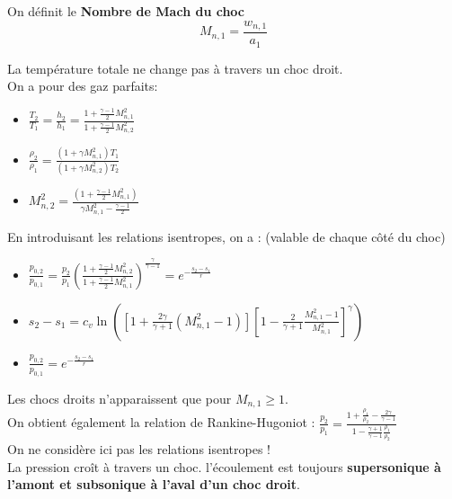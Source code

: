 \documentclass[../main.tex]{subfiles}
\begin{document}
On définit le \textbf{Nombre de Mach du choc} \begin{equation}
    M_{n,1} = \frac{w_{n,1}}{a_1}
\end{equation}

\warning La température totale ne change pas à travers un choc droit.\\

On a pour des gaz parfaits: \begin{itemize}
    \item $\frac{T_2}{T_1} = \frac{h_2}{h_1} = \frac{1+ \frac{\gamma-1}{2} M_{n,1}^2}{1+\frac{\gamma-1}{2}M_{n,2}^2}$\\
    \item $\frac{\rho_2}{\rho_1} = \frac{(1+\gamma M_{n,1}^2)T_1}{(1+\gamma M_{n,2}^2)T_2}$\\
    \item $M_{n,2}^2 = \frac{(1+\frac{\gamma-1}{2} M_{n,1}^2)}{\gamma M_{n,1}^2 - \frac{\gamma-1}{2}}$\\
\end{itemize}

En introduisant les relations isentropes, on a : (valable de chaque côté du choc) \begin{itemize}
    \item $\frac{p_{0,2}}{p_{0,1}} = \frac{p_2}{p_1} (\frac{1+ \frac{\gamma-1}{2} M_{n,2}^2}{1+ \frac{\gamma-1}{2} M_{n,1}^2})^{\frac{\gamma}{\gamma-1}} = e^{-\frac{s_2-s_1}{r}}$\\
    \item $s_2-s_1 = c_v \ln([1+\frac{2\gamma}{\gamma+1}(M_{n,1}^2-1)][1-\frac{2}{\gamma+1} \frac{M_{n,1}^2-1}{M_{n,1}^2}]^\gamma )$\\
    \item $\frac{p_{0,2}}{p_{0,1}} = e^{-\frac{s_2-s_1}{r}}$\\
\end{itemize}

\warning Les chocs droits n'apparaissent que pour $M_{n,1} \geq 1$.\\

On obtient également la relation de Rankine-Hugoniot : $\frac{p_2}{p_1} = \frac{1+\frac{\rho_1}{\rho_2} - \frac{2\gamma}{\gamma-1}}{1-\frac{\gamma+1}{\gamma-1} \frac{\rho_1}{\rho_2}}$ \\
\warning On ne considère ici pas les relations isentropes !\\

La pression croît à travers un choc. l'écoulement est toujours \textbf{supersonique à l'amont et subsonique à l'aval d'un choc droit}.\\
\end{document}
